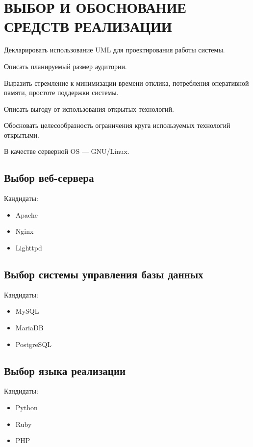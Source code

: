 \section[Выбор и обоснование средств реализации]{ВЫБОР И ОБОСНОВАНИЕ \\ СРЕДСТВ РЕАЛИЗАЦИИ}

Декларировать использование UML для проектирования работы системы.

Описать планируемый размер аудитории.

Выразить стремление к минимизации времени отклика,
потребления оперативной памяти, простоте поддержки системы. 

Описать выгоду от использования открытых технологий.

Обосновать целесообразность ограничения круга 
используемых технологий открытыми.

В качестве серверной OS --- GNU/Linux.

\subsection{Выбор веб-сервера}

Кандидаты:
\begin{itemize}
  \item Apache

  \item Nginx

  \item Lighttpd
\end{itemize}

\subsection{Выбор системы управления базы данных}

Кандидаты:
\begin{itemize}
\item MySQL

\item MariaDB

\item PostgreSQL
\end{itemize}

\subsection{Выбор языка реализации}

Кандидаты:
\begin{itemize}
\item Python

\item Ruby

\item PHP
\end{itemize}